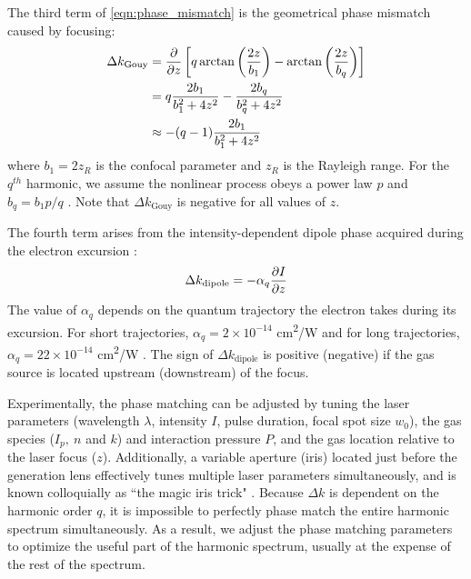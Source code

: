 The third term of \cref{eqn:phase_mismatch} is the geometrical phase mismatch caused by focusing:
\begin{align}
\Delta k_{\textrm{Gouy}} &= \pdv{z} \left[ q \arctan\left( \frac{2 z}{b_1} \right) - \arctan \left( \frac{2 z}{b_q} \right) \right] \nonumber \\
&= q \frac{2 b_1}{b_1^2 + 4 z^2} - \frac{2 b_q}{b_q^2 + 4 z^2} \nonumber \\
&\approx -(q-1) \frac{2 b_1}{b_1^2 + 4 z^2}
\end{align}
where $b_1 = 2 z_R$ is the confocal parameter and $z_R$ is the Rayleigh range. For the $q^{th}$ harmonic, we assume the nonlinear process obeys a power law $p$ and $b_q = b_1 p /q$ \cite{schounAttosecondHighHarmonicSpectroscopy2015}. Note that $\Delta k_{\textrm{Gouy}}$ is negative for all values of $z$.

The fourth term arises from the intensity-dependent dipole phase acquired during the electron excursion \cite{lewensteinTheoryHighharmonicGeneration1994,balcouGeneralizedPhasematchingConditions1997,salieresCoherenceControlHighOrder1995}:
\begin{equation}
\Delta k_{\textrm{dipole}} = - \alpha_q \pdv{I}{z}
\label{eqn:deltak_atomic}
\end{equation}
The value of $\alpha_q$ depends on the quantum trajectory the electron takes during its excursion. For short trajectories, {$\alpha_q = 2 \times 10^{-14}$ cm\textsuperscript{2}/W} and for long trajectories, {$\alpha_q = 22 \times 10^{-14}$ cm\textsuperscript{2}/W} \cite{kazamiasPressureinducedPhaseMatching2011,balcouQuantumpathAnalysisPhase1999}. The sign of $\Delta k_{\textrm{dipole}}$ is positive (negative) if the gas source is located upstream (downstream) of the focus.

Experimentally, the phase matching can be adjusted by tuning the laser parameters (wavelength $\lambda$, intensity $I$, pulse duration, focal spot size $w_0$), the gas species ($I_p, \ n$ and $k$) and interaction pressure $P$, and the gas location relative to the laser focus ($z$). Additionally, a variable aperture (iris) located just before the generation lens effectively tunes multiple laser parameters simultaneously, and is known colloquially as ``the magic iris trick" \cite{kazamiasHighOrderHarmonic2002}. Because $\Delta k$ is dependent on the harmonic order $q$, it is impossible to perfectly phase match the entire harmonic spectrum simultaneously. As a result, we adjust the phase matching parameters to optimize the useful part of the harmonic spectrum, usually at the expense of the rest of the spectrum.

